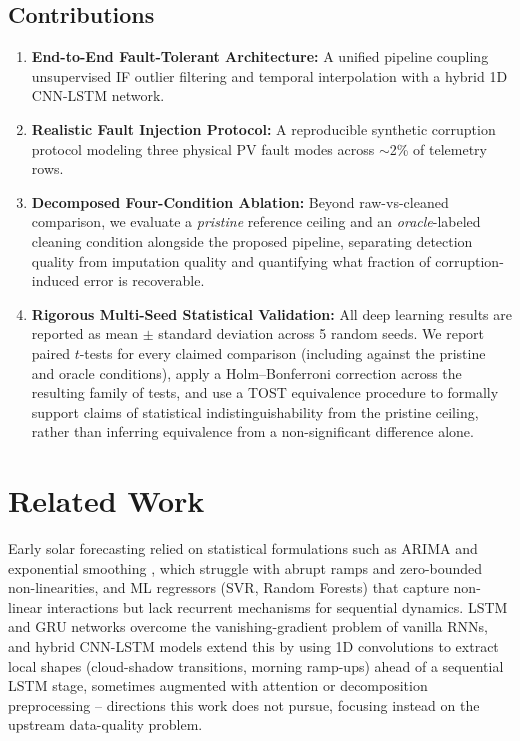 \documentclass[conference]{IEEEtran}
\begin{document}
\subsection*{Contributions}
\begin{enumerate}
    \item \textbf{End-to-End Fault-Tolerant Architecture:} A unified pipeline coupling unsupervised IF outlier filtering and temporal interpolation with a hybrid 1D CNN-LSTM network.
    \item \textbf{Realistic Fault Injection Protocol:} A reproducible synthetic corruption protocol modeling three physical PV fault modes across $\sim$2\% of telemetry rows.
    \item \textbf{Decomposed Four-Condition Ablation:} Beyond raw-vs-cleaned comparison, we evaluate a \emph{pristine} reference ceiling and an \emph{oracle}-labeled cleaning condition alongside the proposed pipeline, separating detection quality from imputation quality and quantifying what fraction of corruption-induced error is recoverable.
    \item \textbf{Rigorous Multi-Seed Statistical Validation:} All deep learning results are reported as mean $\pm$ standard deviation across 5 random seeds. We report paired $t$-tests for every claimed comparison (including against the pristine and oracle conditions), apply a Holm--Bonferroni correction across the resulting family of tests, and use a TOST equivalence procedure to formally support claims of statistical indistinguishability from the pristine ceiling, rather than inferring equivalence from a non-significant difference alone.
\end{enumerate}

\section{Related Work}

Early solar forecasting relied on statistical formulations such as ARIMA and exponential smoothing \cite{zhang2015baseline}, which struggle with abrupt ramps and zero-bounded non-linearities, and ML regressors (SVR, Random Forests) that capture non-linear interactions \cite{abumohsen2024hybrid} but lack recurrent mechanisms for sequential dynamics. LSTM and GRU networks \cite{hochreiter1997lstm} overcome the vanishing-gradient problem of vanilla RNNs, and hybrid CNN-LSTM models \cite{zang2020cnnlstm, obiora2021hourly, qu2021dayahead, boucetta2024enhanced, zhou2024enhancing} extend this by using 1D convolutions to extract local shapes (cloud-shadow transitions, morning ramp-ups) ahead of a sequential LSTM stage, sometimes augmented with attention \cite{qu2021dayahead, zhou2024enhancing} or decomposition preprocessing \cite{boucetta2024enhanced} -- directions this work does not pursue, focusing instead on the upstream data-quality problem.
\end{document}
